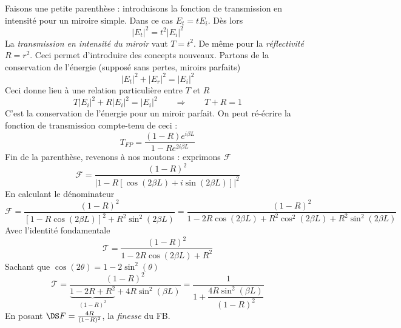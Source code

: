 Faisons une petite parenthèse : introduisons la fonction de transmission en intensité pour 
un miroire simple. Dans ce cas $E_t = tE_i$. Dès lors
\begin{equation}
|E_t|^2 = t^2|E_i|^2
\end{equation}
La \textit{transmission en intensité du miroir} vaut $T=t^2$. De même pour la \textit{réflectivité} 
$R=r^2$. Ceci permet d'introduire des concepts nouveaux. Partons de la conservation de l’énergie 
(supposé sans pertes, miroirs parfaits)
\begin{equation}
|E_t|^2+|E_r|^2=|E_i|^2
\end{equation}
Ceci donne lieu à une relation particulière entre $T$ et $R$
\begin{equation}
T|E_i|^2+R|E_i|^2 = |E_i|^2\qquad\Longrightarrow\qquad T+R=1
\end{equation}
C'est la conservation de l'énergie pour un miroir parfait. On peut ré-écrire la fonction de 
transmission compte-tenu de ceci :
\begin{equation}
T_{FP} = \dfrac{(1-R)e^{i\beta L}}{1-Re^{2i\beta L}}
\end{equation}
Fin de la parenthèse, revenons à nos moutons : exprimons $\mathcal{F}$ 
\begin{equation}
\mathcal{F} = \dfrac{(1-R)^2}{|1-R[\cos(2\beta L)+i\sin(2\beta L)]|^2}
\end{equation}
En calculant le dénominateur
\begin{equation}
\mathcal{F} = \dfrac{(1-R)^2}{[1-R\cos(2\beta L)]^2+R^2\sin^2(2\beta L)} = \dfrac{(1-R)^2}{
1-2R\cos(2\beta L)+R^2\cos^2(2\beta L)+R^2\sin^2(2\beta L)}
\end{equation}
Avec l'identité fondamentale
\begin{equation}
\mathcal{T} = \dfrac{(1-R)^2}{1-2R\cos(2\beta L)+R^2}
\end{equation}
Sachant que $\cos(2\theta) = 1-2\sin^2(\theta)$
\begin{equation}
\mathcal{T} = \dfrac{(1-R)^2}{\underbrace{1-2R+R^2}_{(1-R)^2}+4R\sin^2(\beta L)} = 
\dfrac{1}{1+\dfrac{4R\sin^2(\beta L)}{(1-R)^2}}
\end{equation}
En posant $\DS F=\frac{4R}{(1-R)^2}$, la \textit{finesse} du FB.


\ \\

